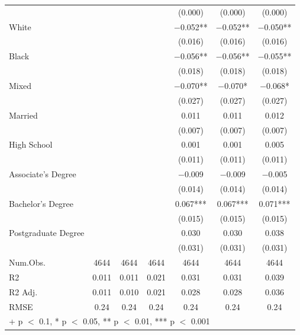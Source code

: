 \documentclass[
]{article}
\begin{document}
\begin{table}
{\begin{tabular}[t]{lcccccc}
 &  &  &  & (\num{0.000}) & (\num{0.000}) & (\num{0.000})\\
White &  &  &  & \num{-0.052}** & \num{-0.052}** & \num{-0.050}**\\
 &  &  &  & (\num{0.016}) & (\num{0.016}) & (\num{0.016})\\
Black &  &  &  & \num{-0.056}** & \num{-0.056}** & \num{-0.055}**\\
 &  &  &  & (\num{0.018}) & (\num{0.018}) & (\num{0.018})\\
Mixed &  &  &  & \num{-0.070}** & \num{-0.070}* & \num{-0.068}*\\
 &  &  &  & (\num{0.027}) & (\num{0.027}) & (\num{0.027})\\
Married &  &  &  & \num{0.011} & \num{0.011} & \num{0.012}\\
 &  &  &  & (\num{0.007}) & (\num{0.007}) & (\num{0.007})\\
High
School &  &  &  & \num{0.001} & \num{0.001} & \num{0.005}\\
 &  &  &  & (\num{0.011}) & (\num{0.011}) & (\num{0.011})\\
Associate's
Degree &  &  &  & \num{-0.009} & \num{-0.009} & \num{-0.005}\\
 &  &  &  & (\num{0.014}) & (\num{0.014}) & (\num{0.014})\\
Bachelor's
Degree &  &  &  & \num{0.067}*** & \num{0.067}*** & \num{0.071}***\\
 &  &  &  & (\num{0.015}) & (\num{0.015}) & (\num{0.015})\\
Postgraduate
Degree &  &  &  & \num{0.030} & \num{0.030} & \num{0.038}\\
 &  &  &  & (\num{0.031}) & (\num{0.031}) & (\num{0.031})\\
\midrule
Num.Obs. & \num{4644} & \num{4644} & \num{4644} & \num{4644} & \num{4644} & \num{4644}\\
R2 & \num{0.011} & \num{0.011} & \num{0.021} & \num{0.031} & \num{0.031} & \num{0.039}\\
R2 Adj. & \num{0.011} & \num{0.010} & \num{0.021} & \num{0.028} & \num{0.028} & \num{0.036}\\
RMSE & \num{0.24} & \num{0.24} & \num{0.24} & \num{0.24} & \num{0.24} & \num{0.24}\\
\bottomrule
\multicolumn{7}{l}{\rule{0pt}{1em}+ p $<$ 0.1, * p $<$ 0.05, ** p $<$ 0.01, *** p $<$ 0.001}\\
\end{tabular}}
\end{table}
\end{document}
